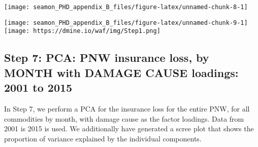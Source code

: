 \documentclass[]{article}
\newenvironment{Shaded}{\begin{snugshade}}{\end{snugshade}}
\newcommand{\CommentTok}[1]{\textcolor[rgb]{0.56,0.35,0.01}{\textit{#1}}}
\newcommand{\DataTypeTok}[1]{\textcolor[rgb]{0.13,0.29,0.53}{#1}}
\newcommand{\DecValTok}[1]{\textcolor[rgb]{0.00,0.00,0.81}{#1}}
\newcommand{\KeywordTok}[1]{\textcolor[rgb]{0.13,0.29,0.53}{\textbf{#1}}}
\newcommand{\NormalTok}[1]{#1}
\newcommand{\OperatorTok}[1]{\textcolor[rgb]{0.81,0.36,0.00}{\textbf{#1}}}
\newcommand{\StringTok}[1]{\textcolor[rgb]{0.31,0.60,0.02}{#1}}
\begin{document}
\texttt{[image: seamon\_PHD\_appendix\_B\_files/figure-latex/unnamed-chunk-8-1]}

\begin{Shaded}
\end{Shaded}

\texttt{[image: seamon\_PHD\_appendix\_B\_files/figure-latex/unnamed-chunk-9-1]}
\texttt{[image: https://dmine.io/waf/img/Step1.png]}

\hypertarget{step-7-pca-pnw-insurance-loss-by-month-with-damage-cause-loadings-2001-to-2015}{%
\subsection{Step 7: PCA: PNW insurance loss, by MONTH with DAMAGE CAUSE
loadings: 2001 to
2015}\label{step-7-pca-pnw-insurance-loss-by-month-with-damage-cause-loadings-2001-to-2015}}

In Step 7, we perform a PCA for the insurance loss for the entire PNW,
for all commodities by month, with damage cause as the factor loadings.
Data from 2001 is 2015 is used. We additionally have generated a scree
plot that shows the proportion of variance explained by the individual
components.
\end{document}
